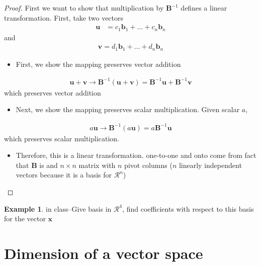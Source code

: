 \documentclass[
]{book}
\providecommand{\tightlist}{%
  \setlength{\itemsep}{0pt}\setlength{\parskip}{0pt}}
\theoremstyle{definition}
\theoremstyle{definition}
\newtheorem{example}{Example}[chapter]
\theoremstyle{definition}
\theoremstyle{definition}
\theoremstyle{remark}
\begin{document}
\begin{proof}

First we want to show that multiplication by \(\mathbf{B}^{-1}\) defines a linear transformation. First, take two vectors
\[
\begin{aligned}
\mathbf{u} &  = c_1 \mathbf{b}_1 + \ldots + c_n \mathbf{b}_n
\end{aligned}
\]
and
\[
\begin{aligned}
\mathbf{v} = d_1 \mathbf{b}_1 + \ldots + d_n \mathbf{b}_n
\end{aligned}
\]

\begin{itemize}
\tightlist
\item
  First, we show the mapping preserves vector addition
\end{itemize}

\[
\begin{aligned}
\mathbf{u} + \mathbf{v} \rightarrow \mathbf{B}^{-1} (\mathbf{u} + \mathbf{v}) =  \mathbf{B}^{-1} \mathbf{u} + \mathbf{B}^{-1} \mathbf{v}
\end{aligned}
\]
which preserves vector addition

\begin{itemize}
\tightlist
\item
  Next, we show the mapping preserves scalar multiplication. Given scalar \(a\),
\end{itemize}

\[
\begin{aligned}
a\mathbf{u} \rightarrow \mathbf{B}^{-1} (a \mathbf{u}) =  a \mathbf{B}^{-1} \mathbf{u}
\end{aligned}
\]
which preserves scalar multiplication.

\begin{itemize}
\tightlist
\item
  Therefore, this is a linear transformation. one-to-one and onto come from fact that \(\mathbf{B}\) is and \(n \times n\) matrix with \(n\) pivot columns (\(n\) linearly independent vectors because it is a basis for \(\mathcal{R}^n\))
\end{itemize}

\end{proof}

\begin{example}
in class--Give basis in \(\mathcal{R}^4\), find coefficients with respect to this basis for the vector \(\mathbf{x}\)
\end{example}

\hypertarget{dimension-of-a-vector-space}{%
\section{Dimension of a vector space}\label{dimension-of-a-vector-space}}
\end{document}
